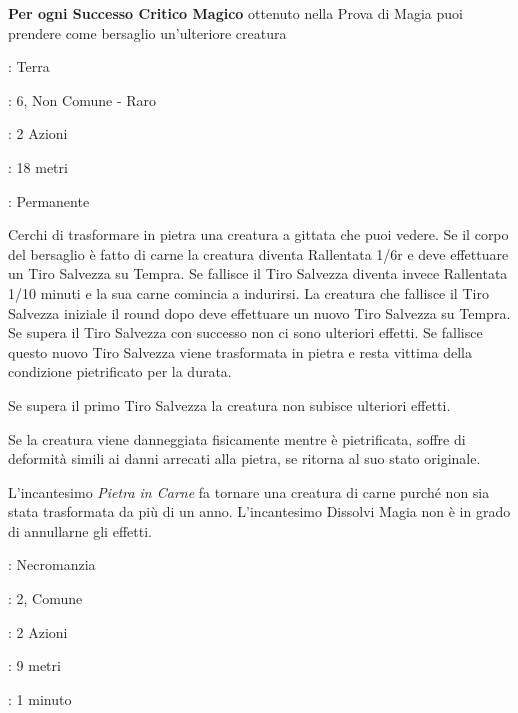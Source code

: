 \begin{multicols}{2}
\textbf{Per ogni Successo Critico Magico} ottenuto nella Prova di Magia puoi prendere come bersaglio un'ulteriore creatura

\noindent\colorbox{OBSSgold!10}{
	\begin{minipage}{0.95\linewidth}
\begin{description}[noitemsep, topsep=0pt, parsep=0pt, partopsep=0pt, leftmargin=0cm, labelwidth=1.3cm]
	\item[\textbf{Lista}]: Terra
	\item[\textbf{Livello}]: 6, Non Comune - Raro
	\item[\textbf{Lancio}]: 2 Azioni
	\item[\textbf{Gittata}]: 18 metri
	\item[\textbf{Durata}]: Permanente
\end{description}
\end{minipage}}\smallskip

Cerchi di trasformare in pietra una creatura a gittata che puoi vedere. Se il corpo del bersaglio è fatto di carne la creatura diventa Rallentata 1/6r e deve effettuare un Tiro Salvezza su Tempra. Se fallisce il Tiro Salvezza diventa invece Rallentata 1/10 minuti e la sua carne comincia a indurirsi.
La creatura che fallisce il Tiro Salvezza iniziale il round dopo deve effettuare un nuovo Tiro Salvezza su Tempra. Se supera il Tiro Salvezza con successo non ci sono ulteriori effetti. Se fallisce questo nuovo Tiro Salvezza viene trasformata in pietra e resta vittima della condizione pietrificato per la durata.

Se supera il primo Tiro Salvezza la creatura non subisce ulteriori effetti.

Se la creatura viene danneggiata fisicamente mentre è pietrificata, soffre di deformità simili ai danni arrecati alla pietra, se ritorna al suo stato originale.

L'incantesimo \emph{Pietra in Carne} fa tornare una creatura di carne purché non sia stata trasformata da più di un anno. L'incantesimo Dissolvi Magia non è in grado di annullarne gli effetti.

\noindent\colorbox{OBSSgold!10}{
\begin{minipage}{0.95\linewidth}
\begin{description}[noitemsep, topsep=0pt, parsep=0pt, partopsep=0pt, leftmargin=0cm, labelwidth=1.3cm]
	\item[\textbf{Lista}]: Necromanzia
	\item[\textbf{Livello}]: 2, Comune
	\item[\textbf{Lancio}]: 2 Azioni
	\item[\textbf{Gittata}]: 9 metri
	\item[\textbf{Durata}]: 1 minuto
\end{description}
\end{minipage}}\smallskip


\end{multicols}
